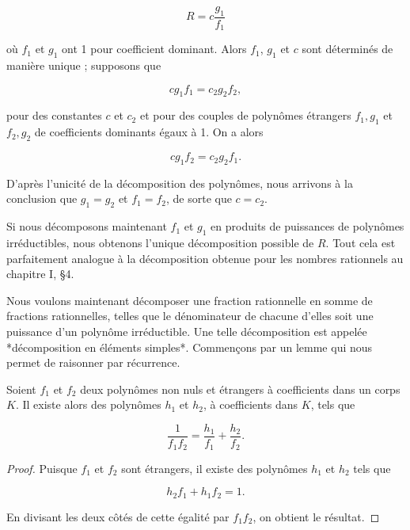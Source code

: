 \[
R = c \frac{g_1}{f_1}
\]

où \( f_1 \) et \( g_1 \) ont 1 pour coefficient dominant. Alors \( f_1 \), \( g_1 \) et \( c \) sont déterminés de manière unique ; supposons que  

\[
c g_1 f_1 = c_2 g_2 f_2,
\]

pour des constantes \( c \) et \( c_2 \) et pour des couples de polynômes étrangers \( f_1, g_1 \) et \( f_2, g_2 \) de coefficients dominants égaux à 1. On a alors  

\[
c g_1 f_2 = c_2 g_2 f_1.
\]

D’après l’unicité de la décomposition des polynômes, nous arrivons à la conclusion que \( g_1 = g_2 \) et \( f_1 = f_2 \), de sorte que \( c = c_2 \).  

Si nous décomposons maintenant \( f_1 \) et \( g_1 \) en produits de puissances de polynômes irréductibles, nous obtenons l’unique décomposition possible de \( R \). Tout cela est parfaitement analogue à la décomposition obtenue pour les nombres rationnels au chapitre I, §4.  

Nous voulons maintenant décomposer une fraction rationnelle en somme de fractions rationnelles, telles que le dénominateur de chacune d’elles soit une puissance d’un polynôme irréductible. Une telle décomposition est appelée *décomposition en éléments simples*. Commençons par un lemme qui nous permet de raisonner par récurrence.

    \begin{lemme}
        Soient \( f_1 \) et \( f_2 \) deux polynômes non nuls et étrangers à coefficients dans un corps \( K \). Il existe alors des polynômes \( h_1 \) et \( h_2 \), à coefficients dans \( K \), tels que  

\[
\frac{1}{f_1 f_2} = \frac{h_1}{f_1} + \frac{h_2}{f_2}.
\]
    \end{lemme}

\begin{proof}
     Puisque \( f_1 \) et \( f_2 \) sont étrangers, il existe des polynômes \( h_1 \) et \( h_2 \) tels que  

\[
h_2 f_1 + h_1 f_2 = 1.
\]

En divisant les deux côtés de cette égalité par \( f_1 f_2 \), on obtient le résultat.  
\end{proof}

